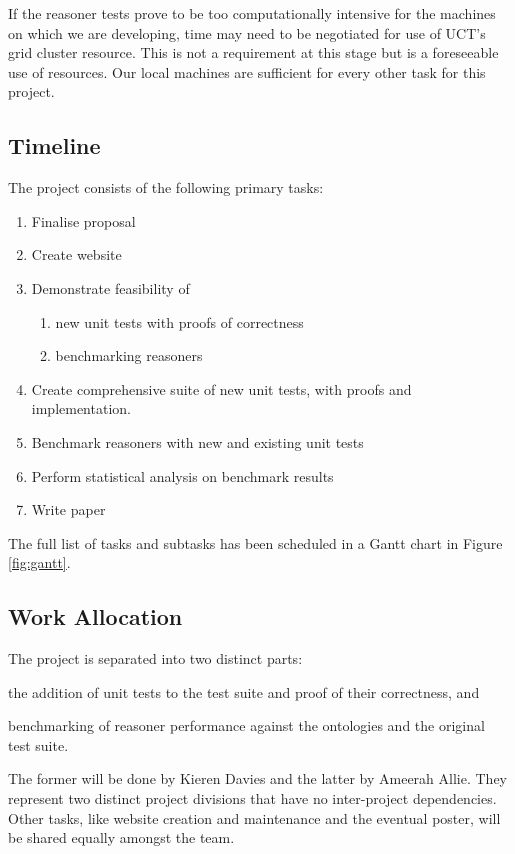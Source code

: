 \documentclass[draft]{sig-alternate}
\begin{document}
If the reasoner tests prove to be too computationally intensive for the machines on which we are developing, time may need to be negotiated for use of UCT's grid cluster resource. This is not a requirement at this stage but is a foreseeable use of resources. Our local machines are sufficient for every other task for this project.

\subsection{Timeline}

The project consists of the following primary tasks:
\begin{enumerate}[noitemsep]
  \item Finalise proposal
  \item Create website
  \item Demonstrate feasibility of
  \begin{enumerate}[nosep]
    \item new unit tests with proofs of correctness
    \item benchmarking reasoners
  \end{enumerate}
  \item Create comprehensive suite of new unit tests, with proofs and implementation.
  \item Benchmark reasoners with new and existing unit tests
  \item Perform statistical analysis on benchmark results
  \item Write paper
\end{enumerate}
The full list of tasks and subtasks has been scheduled in a Gantt chart in Figure \ref{fig:gantt}.

\begin{sidewaysfigure*}
  \caption{Timeline Gantt chart}
  \label{fig:gantt}
  \vspace{6pt}
  \hspace{-1.5cm}
  
\end{sidewaysfigure*}

\subsection{Work Allocation}

The project is separated into two distinct parts:
\begin{enumerate*}[label=(\arabic*)]
  \item the addition of unit tests to the test suite and proof of their correctness, and
  \item benchmarking of reasoner performance against the ontologies and the original test suite.
\end{enumerate*}
The former will be done by Kieren Davies and the latter by Ameerah Allie. They represent two distinct project divisions that have no inter-project dependencies. Other tasks, like website creation and maintenance and the eventual poster, will be shared equally amongst the team.
\end{document}
